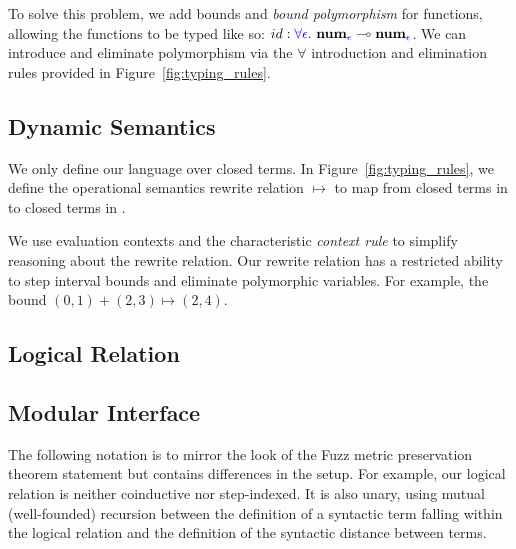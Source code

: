 To solve this problem, we add bounds and \textit{bound polymorphism} for
functions, allowing the functions to be typed like so: $id : \textcolor{blue}{\forall
\epsilon.} ~ \textbf{num}_{\textcolor{blue}{\epsilon}} \multimap
\textbf{num}_{\textcolor{blue}{\epsilon}}$. We can introduce and eliminate polymorphism via
the $\forall$ introduction and elimination rules provided in
Figure~\ref{fig:typing_rules}.



\subsection{Dynamic Semantics} \label{sec:dynamic-semantics}
We only define our language over closed terms. In Figure~\ref{fig:typing_rules},
we define the operational semantics rewrite relation $\mapsto$ to map from
closed terms in \Lang to closed terms in \Lang.

We use evaluation contexts and the characteristic \textit{context rule} to
simplify reasoning about the rewrite relation. Our rewrite relation has a
restricted ability to step interval bounds and eliminate polymorphic variables.
For example, the bound $(0, 1) + (2,3) \mapsto (2, 4)$.



\subsection{Logical Relation} \label{sec:logical-relation}


\subsection{Modular Interface} \label{sec:interface}
The following notation is to mirror the look of the Fuzz metric preservation
theorem statement but contains differences in the setup. For example, our
logical relation is neither coinductive nor step-indexed. It is also unary,
using mutual (well-founded) recursion between the definition of a syntactic term
falling within the logical relation and the definition of the syntactic distance
between terms.

